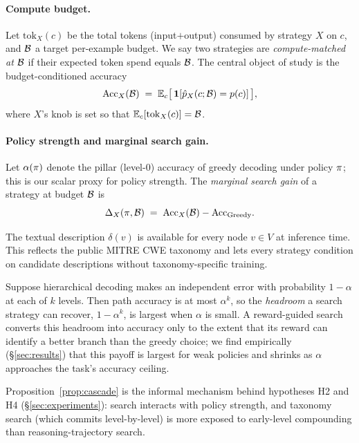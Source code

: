 \paragraph{Compute budget.}
Let $\mathrm{tok}_X(c)$ be the total tokens (input$+$output) consumed by strategy
$X$ on $c$, and $\mathcal{B}$ a target per-example budget. We say two strategies are
\emph{compute-matched at $\mathcal{B}$} if their expected token spend equals $\mathcal{B}$.
The central object of study is the budget-conditioned accuracy
\[
\mathrm{Acc}_X(\mathcal{B}) \;=\; \mathbb{E}_{c}\big[\,\mathbf{1}[\hat p_X(c;\mathcal{B}) = p(c)]\,\big],
\]
where $X$'s knob is set so that $\mathbb{E}_c[\mathrm{tok}_X(c)] = \mathcal{B}$.

\paragraph{Policy strength and marginal search gain.}
Let $\alpha(\pi)$ denote the pillar (level-0) accuracy of greedy decoding under
policy $\pi$; this is our scalar proxy for policy strength. The
\emph{marginal search gain} of a strategy at budget $\mathcal{B}$ is
\[
\Delta_X(\pi, \mathcal{B}) \;=\; \mathrm{Acc}_X(\mathcal{B}) - \mathrm{Acc}_{\text{Greedy}}.
\]

\begin{assumption}
\label{ass:descriptions}
The textual description $\delta(v)$ is available for every node $v \in V$ at
inference time. This reflects the public MITRE CWE taxonomy and lets every
strategy condition on candidate descriptions without taxonomy-specific training.
\end{assumption}

\begin{proposition}
\label{prop:cascade}
Suppose hierarchical decoding makes an independent error with probability
$1-\alpha$ at each of $k$ levels. Then path accuracy is at most $\alpha^k$, so the
\emph{headroom} a search strategy can recover, $1-\alpha^k$, is largest when
$\alpha$ is small. A reward-guided search converts this headroom into accuracy only
to the extent that its reward can identify a better branch than the greedy choice;
we find empirically (\S\ref{sec:results}) that this payoff is largest for weak
policies and shrinks as $\alpha$ approaches the task's accuracy ceiling.
\end{proposition}

Proposition~\ref{prop:cascade} is the informal mechanism behind hypotheses
H2 and H4 (\S\ref{sec:experiments}): search interacts with policy strength, and
taxonomy search (which commits level-by-level) is more exposed to early-level
compounding than reasoning-trajectory search.
